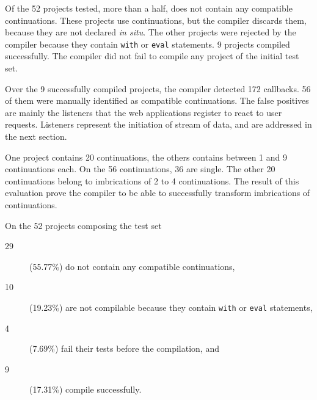 
Of the \num{52} projects tested, more than a half, does not contain any compatible continuations.
These projects use continuations, but the compiler discards them, because they are not declared \textit{in situ}.
The other projects were rejected by the compiler because they contain \texttt{with} or \texttt{eval} statements. %
\num{9} projects compiled successfully.
The compiler did not fail to compile any project of the initial test set.

Over the \num{9} successfully compiled projects, the compiler detected \num{172} callbacks.
56 of them were manually identified as compatible continuations.
The false positives are mainly the listeners that the web applications register to react to user requests.
Listeners represent the initiation of stream of data, and are addressed in the next section.

One project contains \num{20} continuations, the others contains between \num{1} and \num{9} continuations each.
On the \num{56} continuations, \num{36} are single. %
The other \num{20} continuations belong to imbrications of 2 to 4 continuations.
The result of this evaluation prove the compiler to be able to successfully transform imbrications of continuations.

\begin{figure}[h!]
\end{figure}

On the \num{52} projects composing the test set
\begin{description}
\item[29] (55.77\%) do not contain any compatible continuations,
\item[10] (19.23\%) are not compilable because they contain \texttt{with} or \texttt{eval} statements,
\item[4] (7.69\%) fail their tests before the compilation, and
\item[9] (17.31\%) compile successfully.
\end{description}













